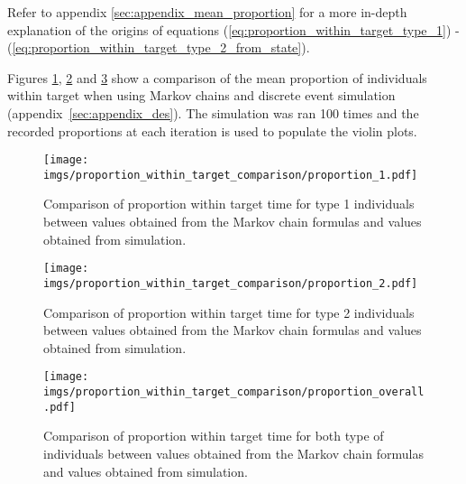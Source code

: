 Refer to appendix \ref{sec:appendix_mean_proportion} for a more in-depth 
explanation of the origins of equations 
(\ref{eq:proportion_within_target_type_1}) - 
(\ref{eq:proportion_within_target_type_2_from_state}).

Figures \ref{fig:markov_vs_des_proportion_comparison_1},
\ref{fig:markov_vs_des_proportion_comparison_2} and 
\ref{fig:markov_vs_des_proportion_comparison_overall} show a comparison of the
mean proportion of individuals within target when using Markov chains and 
discrete event simulation (appendix~\ref{sec:appendix_des}).
The simulation was ran 100 times and the recorded proportions at each iteration 
is used to populate the violin plots.

\begin{figure}[H]
    \centering
    \texttt{[image: imgs/proportion\_within\_target\_comparison/proportion\_1.pdf]}
    \caption{
        Comparison of proportion within target time for type 1 individuals 
        between values obtained from the Markov chain formulas and values 
        obtained from simulation. 
    }
    \label{fig:markov_vs_des_proportion_comparison_1}
\end{figure}

\begin{figure}[H]
    \centering
    \texttt{[image: imgs/proportion\_within\_target\_comparison/proportion\_2.pdf]}
    \caption{
        Comparison of proportion within target time for type 2 individuals 
        between values obtained from the Markov chain formulas and values 
        obtained from simulation. 
    }
    \label{fig:markov_vs_des_proportion_comparison_2}
\end{figure}

\begin{figure}[H]
    \centering
    \texttt{[image: imgs/proportion\_within\_target\_comparison/proportion\_overall.pdf]}
    \caption{
        Comparison of proportion within target time for both type of 
        individuals between values obtained from the Markov chain formulas 
        and values obtained from simulation. 
    }
    \label{fig:markov_vs_des_proportion_comparison_overall}
\end{figure}
